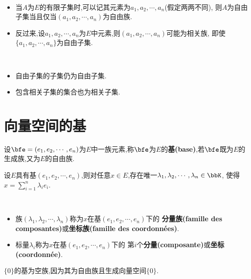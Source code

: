 \begin{rqq} $\ $
    \begin{itemize}
        \item 当$A$为$E$的有限子集时,可以记其元素为$a_1, a_2, \cdots, a_n$(假定两两不同),
            则$A$为自由子集当且仅当$(a_1, a_2, \cdots, a_n)$为自由族.
        \item 反过来,设$a_1, a_2, \cdots, a_n$为$E$中元素,则$(a_1, a_2, \cdots, a_n)$可能为相关族,
            即使$\{ a_1, a_2, \cdots, a_n \}$为自由子集.
    \end{itemize}
\end{rqq}

\begin{prop} $\ $
    \begin{itemize}
        \item 自由子集的子集仍为自由子集.
        \item 包含相关子集的集合也为相关子集.
    \end{itemize}
\end{prop}

\section{向量空间的基}

\begin{deff}
    设$\bfe = (e_1, e_2, \cdots, e_n)$为$E$中一族元素,称$\bfe$为$E$的\textbf{基(base)},若$\bfe$既为$E$的生成族,又为$E$的自由族.
\end{deff}

\begin{thm}
    设$E$具有基$(e_1, e_2, \cdots, e_n)$,则对任意$x \in E$,存在唯一$\lambda_1, \lambda_2, \cdots, \lambda_n \in \bbK$,
    使得$x = \sum\limits_{i = 1}^n \lambda_i e_i$.
\end{thm}

\begin{deff} $\ $
    \begin{itemize}
        \item 族$(\lambda_1, \lambda_2, \cdots, \lambda_n)$称为$x$在基$(e_1, e_2, \cdots, e_n)$下的
            \textbf{分量族(famille des composantes)}或\textbf{坐标族(famille des coordonnées)}.
        \item 标量$\lambda_i$称为$x$在基$(e_1, e_2, \cdots, e_n)$下的
            第$i$个\textbf{分量(composante)}或\textbf{坐标(coordonnée)}.
    \end{itemize}
\end{deff}

\begin{rqq}
    $\{ 0 \}$的基为空族,因为其为自由族且生成向量空间$\{ 0 \}$.
\end{rqq}

